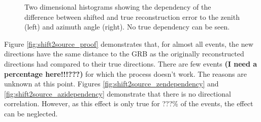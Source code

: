 \begin{figure}[h]
\centering
 \captionsetup{width=.9\textwidth}
\caption{Two dimensional histograms showing the dependency of the difference 
between shifted and true reconstruction error to the zenith (left) and azimuth 
angle (right). No true dependency can be seen.}
\end{figure}

Figure \ref{fig:shift2source_proof} demonstrates that, for almost all events, 
the new directions 
have
 the same distance to the GRB as the originally
reconstructed directions had compared to their true directions. There are few 
events \textbf{(I need a percentage here!!!???)} for which the process doesn't 
work. The reasons are unknown at this point. Figures 
\ref{fig:shift2source_zendependency} and \ref{fig:shift2source_azidependency} 
demonstrate that there is no directional correlation. However, as this effect 
is only true for ???\% of the events, the effect can be neglected.
